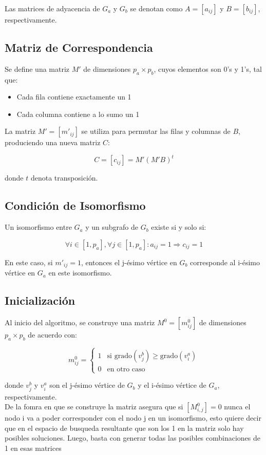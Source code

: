 \documentclass[12pt,a4paper]{article}
\begin{document}
Las matrices de adyacencia de \(G_a\) y \(G_b\) se denotan como \(A = [a_{ij}]\) y \(B = [b_{ij}]\), respectivamente.

\subsection{Matriz de Correspondencia}

Se define una matriz \(M'\) de dimensiones \(p_a \times p_b\), cuyos elementos son 0's y 1's, tal que:

\begin{itemize}
    \item Cada fila contiene exactamente un 1
    \item Cada columna contiene a lo sumo un 1
\end{itemize}

La matriz \(M' = [m'_{ij}]\) se utiliza para permutar las filas y columnas de \(B\), produciendo una nueva matriz \(C\):

\[C = [c_{ij}] = M'(M'B)^t\]

donde \(t\) denota transposición.

\subsection{Condición de Isomorfismo}

Un isomorfismo entre \(G_a\) y un subgrafo de \(G_b\) existe si y solo si:

\[\forall i \in [1, p_a], \forall j \in [1, p_a]: a_{ij} = 1 \Rightarrow c_{ij} = 1\]

En este caso, si \(m'_{ij} = 1\), entonces el j-ésimo vértice en \(G_b\) corresponde al i-ésimo vértice en \(G_a\) en este isomorfismo.

\subsection{Inicialización}

Al inicio del algoritmo, se construye una matriz \(M^0 = [m^0_{ij}]\) de dimensiones \(p_a \times p_b\) de acuerdo con:

\[
m^0_{ij} = 
\begin{cases}
1 & \text{si } \text{grado}(v^b_j) \geq \text{grado}(v^a_i) \\
0 & \text{en otro caso}
\end{cases}
\]

donde \(v^b_j\) y \(v^a_i\) son el j-ésimo vértice de \(G_b\) y el i-ésimo vértice de \(G_a\), respectivamente.
\\
De la fomra en que se construye la matriz asegura que si \([M^0_{i,j}] = 0\) nunca el nodo i va a poder corresponder con el nodo j en un isomorfismo, esto quiere decir que en el espacio de busqueda resultante que son los 1 en la matriz solo hay posibles soluciones. Luego, basta con generar todas las posibles combinaciones de 1 en esas matrices
\end{document}
